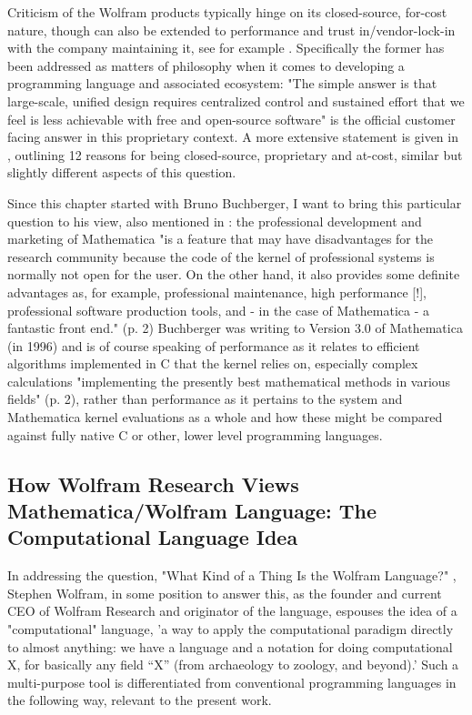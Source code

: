 Criticism of the Wolfram products typically hinge on its closed-source, for-cost nature, though can also be extended to performance and trust in/vendor-lock-in with the company maintaining it, see for example \cite{noauthor_why_2022}. Specifically the former has been addressed as matters of philosophy when it comes to developing a programming language and associated ecosystem: "The simple answer is that large-scale, unified design requires centralized control and sustained effort that we feel is less achievable with free and open-source software" \cite{noauthor_wolfram_nodate} is the official customer facing answer in this proprietary context. A more extensive statement is given in \cite{noauthor_why_2019}, outlining 12 reasons for being closed-source, proprietary and at-cost, similar but slightly different aspects of this question.

Since this chapter started with Bruno Buchberger, I want to bring this particular question to his view, also mentioned in \cite{buchberger_mathematica_1996}: the professional development and marketing of Mathematica "is a feature that may have disadvantages for the research community because the code of the kernel of professional systems is normally not open for the user. On the other hand, it also provides some definite advantages as, for example, professional maintenance, high performance [!], professional software production tools, and - in the case of Mathematica - a fantastic front end." (p. 2) Buchberger was writing to Version 3.0 of Mathematica (in 1996) and is of course speaking of performance as it relates to efficient algorithms implemented in C that the kernel relies on, especially complex calculations "implementing the presently best mathematical methods in various fields" (p. 2), rather than performance as it pertains to the system and Mathematica kernel evaluations as a whole and how these might be compared against fully native C or other, lower level programming languages.

\subsection{How Wolfram Research Views Mathematica/Wolfram Language: The Computational Language Idea} \label{computational-language}

In addressing the question, "What Kind of a Thing Is the Wolfram Language?" \cite{noauthor_what_2019}, Stephen Wolfram, in some position to answer this, as the founder and current CEO of Wolfram Research and originator of the language, espouses the idea of a "computational" language, 'a way to apply the computational paradigm directly to almost anything: we have a language and a notation for doing computational X, for basically any field “X” (from archaeology to zoology, and beyond).' \cite{noauthor_what_2019} Such a multi-purpose tool is differentiated from conventional programming languages in the following way, relevant to the present work.

